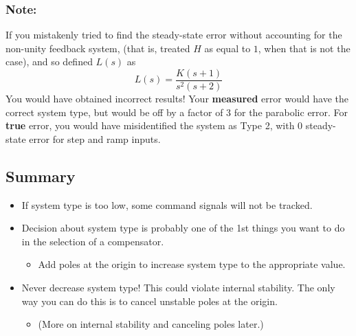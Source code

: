 \documentclass{book}
\begin{document}
\subsubsection*{Note:} If you mistakenly tried to find the steady-state error without accounting for the  non-unity feedback system, (that is, treated $ H $ as equal to $ 1 $, when that is not the case), and so defined $ L(s) $ as
\[ L(s) = \dfrac{K(s+1)}{s^2(s+2)} \]
You would have obtained incorrect results! Your \textbf{measured} error would have the correct system type, but would be off by a factor of 3 for the parabolic error. For \textbf{true} error, you would have misidentified the system as Type 2, with 0 steady-state error for step and ramp inputs.

\subsection*{Summary}
\begin{itemize}
	\item If system type is too low, some command signals will not be tracked.
	\item Decision about system type is probably one of the 1st things you want to do in the selection of a compensator.
		\begin{itemize}
			\item Add poles at the origin to increase system type to the appropriate value.
		\end{itemize}
	\item Never decrease system type! This could violate internal stability. The only way you can do this is to cancel unstable poles at the origin.
	\begin{itemize}
		\item (More on internal stability and canceling poles later.)
	\end{itemize}
		
\end{itemize}
\end{document}

